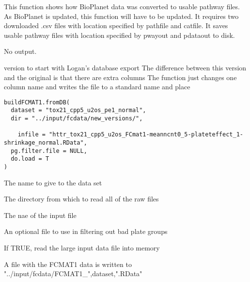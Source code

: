 \documentclass[letterpaper]{book}
\begin{document}
%
\begin{Details}\relax
This function shows how BioPlanet data was converted to usable pathway files.
As BioPlanet is updated, this function will have to be updated. It requires
two downloaded .csv files with location specified by pathfile and catfile.
It saves usable pathway files with location specified by pwayout and
pdataout to disk.
\end{Details}
%
\begin{Value}
No output.
\end{Value}
%
\begin{Description}\relax
version to start with Logan's database export
The difference between this version and the original is that there are extra columns
The function just changes one column name and writes the file to a standard name and place
\end{Description}
%
\begin{Usage}
\begin{verbatim}
buildFCMAT1.fromDB(
  dataset = "tox21_cpp5_u2os_pe1_normal",
  dir = "../input/fcdata/new_versions/",
 
    infile = "httr_tox21_cpp5_u2os_FCmat1-meanncnt0_5-plateteffect_1-shrinkage_normal.RData",
  pg.filter.file = NULL,
  do.load = T
)
\end{verbatim}
\end{Usage}
%
\begin{Arguments}
\begin{ldescription}
\item[\code{dataset}] The name to give to the data set

\item[\code{dir}] The directory from which to read all of the raw files

\item[\code{infile}] The nae of the input file

\item[\code{pg.filter.file}] An optional file to use in filtering out bad plate groups

\item[\code{do.load}] If TRUE, read the large input data file into memory
\end{ldescription}
\end{Arguments}
%
\begin{Value}
A file with the FCMAT1 data is written to "../input/fcdata/FCMAT1\_",dataset,".RData"
\end{Value}
\end{document}
